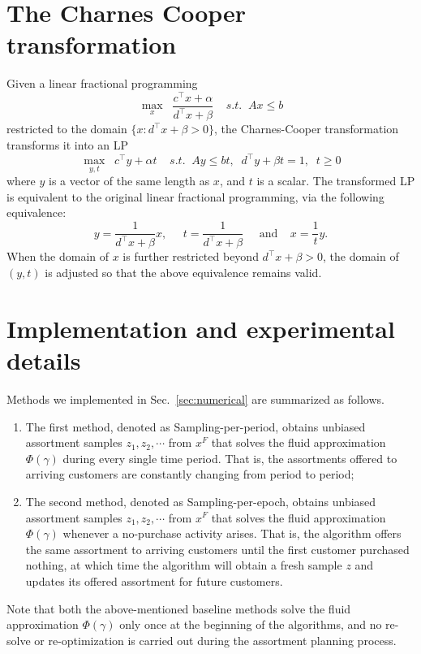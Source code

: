 \documentclass[opre]{informs3aa}
\begin{document}
\begin{appendices}
{
\section{The Charnes Cooper transformation}\label{sec:cp}
Given a linear fractional programming
$$
\max_x\;\; \frac{c^\top x+\alpha}{d^\top x+\beta}\;\;\;\;s.t.\;\; Ax\leq b
$$
restricted to the domain $\{x: d^\top x+\beta>0\}$, the Charnes-Cooper transformation transforms it into an LP
$$
\max_{y,t}\;\; c^\top y+\alpha t\;\;\;\;s.t.\;\; Ay\leq bt,\;\; d^\top y+\beta t=1,\;\;t\geq 0
$$
where $y$ is a vector of the same length as $x$, and $t$ is a scalar. The transformed LP is equivalent to the original linear fractional programming, via the following equivalence:
$$
y=\frac{1}{d^\top x+\beta}x,\;\;\;\;\; t = \frac{1}{d^\top x+\beta}\;\;\;\;\;\text{and}\;\;\;\; x=\frac{1}{t} y.
$$
When the domain of $x$ is further restricted beyond $d^\top x+\beta>0$, the domain of $(y,t)$ is adjusted so that the above equivalence remains valid.
}

\section{Implementation and experimental details}\label{appsec:numerical}

Methods we implemented in Sec.~\ref{sec:numerical} are summarized as follows.
\begin{enumerate}
\item The first method, denoted as \textsf{Sampling-per-period}, obtains unbiased assortment samples $z_1,z_2,\cdots$ from $x^F$ that solves the fluid approximation $\Phi(\gamma)$ during every single time period. That is, the assortments offered to arriving customers are constantly changing from period to period;
\item The second method, denoted as \textsf{Sampling-per-epoch}, obtains unbiased assortment samples $z_1,z_2,\cdots$ from $x^F$ that solves the fluid approximation $\Phi(\gamma)$ whenever a no-purchase activity arises. That is, the algorithm offers the same assortment to arriving customers until the first customer purchased nothing, at which time the algorithm will obtain a fresh sample $z$ and updates its offered assortment for future customers.
\end{enumerate}
Note that both the above-mentioned baseline methods solve the fluid approximation $\Phi(\gamma)$ only once at the beginning of the algorithms,
and no re-solve or re-optimization is carried out during the assortment planning process.


\end{appendices}
\end{document}
